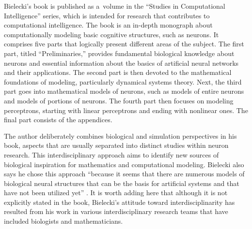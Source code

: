 Bielecki's book is published as a~volume in the ``Studies in Computational Intelligence'' series, which is intended for research that contributes to computational intelligence. The book is an in-depth monograph about computationally modeling basic cognitive structures, such as neurons. It comprises five parts that logically present different areas of the subject. The first part, titled ``Preliminaries,'' provides fundamental biological knowledge about neurons and essential information about the basics of artificial neural networks and their applications. The second part is then devoted to the mathematical foundations of modeling, particularly dynamical systems theory. Next, the third part goes into mathematical models of neurons, such as models of entire neurons and models of portions of neurons. The fourth part then focuses on modeling perceptrons, starting with linear perceptrons and ending with nonlinear ones. The final part consists of the appendices.

The author deliberately combines biological and simulation perspectives in his book, aspects that are usually separated into distinct studies within neuron research. This interdisciplinary approach aims to identify new sources of biological inspiration for mathematics and computational modeling. Bielecki also says he chose this approach ``because it seems that there are numerous models of biological neural structures that can be the basis for artificial systems and that have not been utilized yet''
\parencite[][p.3]{bielecki_models_2019}. %
 It is worth adding here that although it is not explicitly stated in the book, Bielecki's attitude toward interdisciplinarity has resulted from his work in various interdisciplinary research teams that have included biologists and mathematicians.

